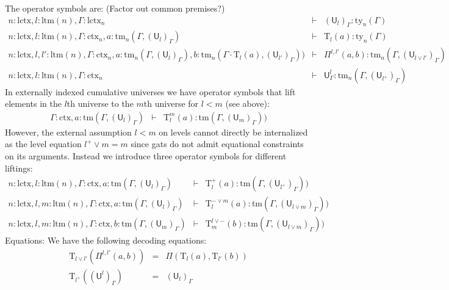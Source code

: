 \documentclass[11pt,a4paper]{article}
\theoremstyle{definition}
\newcommand{\UU}{\mathsf{U}}
\def\UU{\mathsf{U}}
\newcommand{\N}{\mathsf{N}}
\def\Pihat{\Pi}
\def\lctx{\mathrm{lctx}}
\def\ltm{\mathrm{ltm}}
\newcommand{\ctx}{\mathrm{ctx}}
\newcommand{\ty}{\mathrm{ty}}
\newcommand{\tm}{\mathrm{tm}}
\def\U{\mathsf{U}}
\newcommand{\Ta}{\mathrm{T}}
\begin{document}
The operator symbols are: (Factor out common premises?)
\begin{eqnarray*}
n : \lctx, l : \ltm(n), \Gamma : \lctx_n &\vdash& (\U_{l})_\Gamma : \ty_n(\Gamma)\\
n : \lctx, l : \ltm(n), \Gamma : \ctx_n, a : \tm_n(\Gamma,(\U_{l})_\Gamma) &\vdash& {\Ta_{l}}(a) : \ty_n(\Gamma)\\
n : \lctx, l, l' : \ltm(n), \Gamma : \ctx_n,
a : \tm_n(\Gamma,(\U_{l})_\Gamma),
b :  \tm_n(\Gamma \cdot \Ta_{l}(a), (\U_{l'})_\Gamma))
&\vdash&
 \Pihat^{l,l'}(a,b) : \tm_n(\Gamma,(\U_{l \vee l'})_\Gamma)\\
 n : \lctx, l : \ltm(n),\Gamma : \ctx_n&\vdash&\UU^l_\Gamma: \tm_n(\Gamma,(\UU_{l^+})_\Gamma)
\end{eqnarray*}
In externally indexed cumulative universes we have operator symbols that lift elements in the $l$th universe to the $m$th universe for $l < m$ (see above):
\begin{eqnarray*}
\Gamma : \ctx, a : \tm(\Gamma,(\U_{l})_\Gamma) &\vdash& {\Ta^m_{l}}(a) : \tm(\Gamma,(\U_{m})_\Gamma))
\end{eqnarray*}
However, the external assumption $l < m$ on levels cannot directly be internalized as the level equation $l^+ \vee m = m$ since gats do not admit equational constraints on its arguments. Instead we introduce three operator symbols for different liftings:
\begin{eqnarray*}
n : \lctx, l : \ltm(n), \Gamma : \ctx, a : \tm(\Gamma,(\U_{l})_\Gamma) &\vdash& {\Ta^{+}_{l}}(a) : \tm(\Gamma,(\U_{l^+})_\Gamma))\\
n : \lctx, l,m : \ltm(n), \Gamma : \ctx, a : \tm(\Gamma,(\U_{l})_\Gamma) &\vdash& {\Ta^{- \vee m}_{l}}(a) : \tm(\Gamma,(\U_{l \vee m})_\Gamma))\\
n : \lctx, l,m : \ltm(n), \Gamma : \ctx, b : \tm(\Gamma,(\U_{m})_\Gamma) &\vdash& {\Ta^{l \vee -}_{m}}(b) : \tm(\Gamma,(\U_{l \vee m})_\Gamma))
\end{eqnarray*}
Equations:
We have the following decoding equations:
\begin{eqnarray*}
\Ta_{l \vee l'}(\Pi^{l,l'}(a,b)) &=& \Pi(\Ta_l(a),\Ta_{l'}(b))\\
\Ta_{l^+}((\UU^l)_\Gamma) &=& (\UU_l)_\Gamma 
\end{eqnarray*}
\end{document}
